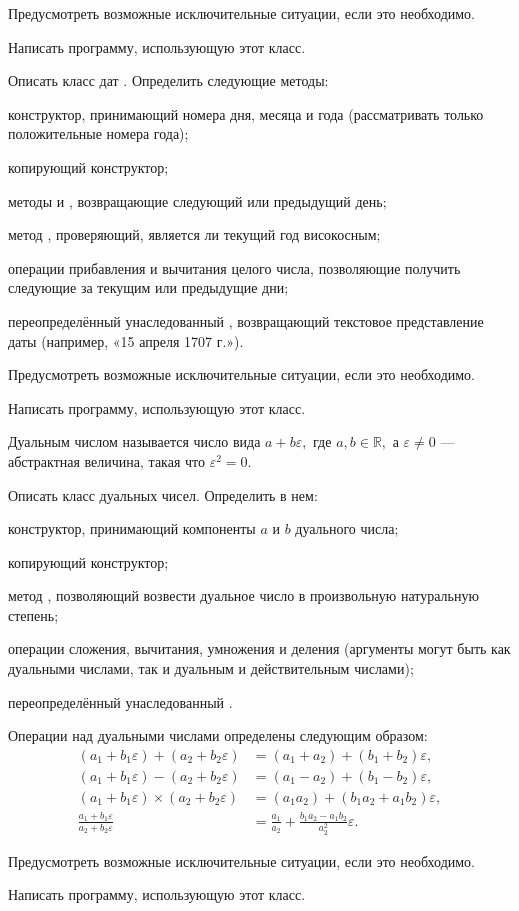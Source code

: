 Предусмотреть возможные исключительные ситуации, если это необходимо.

Написать программу, использующую этот класс.

\task Описать класс дат . Определить следующие методы:
\begin{itemize*}
\item конструктор, принимающий номера дня, месяца и года
  (рассматривать только положительные номера года);
\item копирующий конструктор;
\item методы  и , возвращающие следующий или
  предыдущий день;
\item метод , проверяющий, является ли текущий год
  високосным;
\item операции прибавления и вычитания целого числа, позволяющие
  получить следующие за текущим или предыдущие дни;
\item переопределённый унаследованный , возвращающий текстовое
  представление даты (например, «15 апреля 1707 г.»).
\end{itemize*}

Предусмотреть возможные исключительные ситуации, если это необходимо.

Написать программу, использующую этот класс.

\task Дуальным числом называется число вида $a+b\varepsilon,$ где $a,
b \in \mathbb{R},$ а $\varepsilon \neq 0$ — абстрактная величина,
такая что $\varepsilon^2 = 0$.

Описать класс  дуальных чисел. Определить в нем:
\begin{itemize*}
\item конструктор, принимающий компоненты $a$ и $b$ дуального числа;
\item копирующий конструктор;
\item метод , позволяющий возвести дуальное число в
  произвольную натуральную степень;
\item операции сложения, вычитания, умножения и деления (аргументы
  могут быть как дуальными числами, так и дуальным и действительным
  числами);
\item переопределённый унаследованный .
\end{itemize*}

Операции над дуальными числами определены
следующим образом:
\begin{align*}
  (a_1+b_1\varepsilon) + (a_2+b_2\varepsilon) &= (a_1+a_2) + (b_1+b_2)\varepsilon,\\
  (a_1+b_1\varepsilon) - (a_2+b_2\varepsilon) &= (a_1-a_2) + (b_1-b_2)\varepsilon,\\
  (a_1+b_1\varepsilon) \times (a_2+b_2\varepsilon) &= (a_1a_2) + (b_1a_2+a_1b_2)\varepsilon,\\
  \frac{a_1+b_1\varepsilon}{a_2+b_2\varepsilon} &=
  \frac{a_1}{a_2} + \frac{b_1a_2-a_1b_2}{a_2^2}\varepsilon.
\end{align*}

Предусмотреть возможные исключительные ситуации, если это необходимо.

Написать программу, использующую этот класс.
